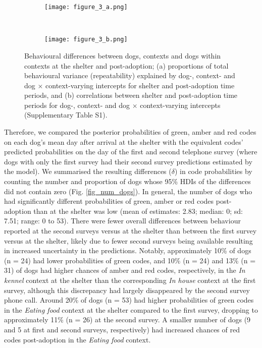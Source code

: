 \documentclass[fleqn,10pt]{wlscirep}
\begin{document}
\begin{figure}[t!]
  \centering
  \begin{subfigure}{0.5\textwidth}
    \centering
    \texttt{[image: figure\_3\_a.png]}
  \end{subfigure}%
  ~
  \begin{subfigure}{0.5\textwidth}
    \centering
    \texttt{[image: figure\_3\_b.png]}
  \end{subfigure}
  \caption{Behavioural differences between dogs, contexts and dogs within contexts at the shelter and post-adoption; (a) proportions of total behavioural variance (repeatability) explained by dog-, context- and dog $\times$ context-varying intercepts for shelter and post-adoption time periods, and (b) correlations between shelter and post-adoption time periods for dog-, context- and dog $\times$ context-varying intercepts (Supplementary Table S1).}
  \label{fig_corrs_rept}
\end{figure}

Therefore, we compared the posterior probabilities of green, amber and red codes on each dog's mean day after arrival at the shelter with the equivalent codes' predicted probabilities on the day of the first and second telephone survey (where dogs with only the first survey had their second survey predictions estimated by the model). We summarised the resulting differences ($\delta$) in code probabilities by counting the number and proportion of dogs whose 95\% HDIs of the differences did not contain zero (Fig. \ref{fig_num_dogs}). In general, the number of dogs who had significantly different probabilities of green, amber or red codes post-adoption than at the shelter was low (mean of estimates: 2.83; median: 0; sd: 7.51; range: 0 to 53). There were fewer overall differences between behaviour reported at the second surveys versus at the shelter than between the first survey versus at the shelter, likely due to fewer second surveys being available resulting in increased uncertainty in the predictions. Notably, approximately 10\% of dogs (n = 24) had lower probabilities of green codes, and 10\% (n = 24) and 13\% (n = 31) of dogs had higher chances of amber and red codes, respectively, in the \textit{In kennel} context at the shelter than the corresponding \textit{In house} context at the first survey, although this discrepancy had largely disappeared by the second survey phone call. Around 20\% of dogs (n = 53) had higher probabilities of green codes in the \textit{Eating food} context at the shelter compared to the first survey, dropping to approximately 11\% (n = 26) at the second survey. A smaller number of dogs (9 and 5 at first and second surveys, respectively) had increased chances of red codes post-adoption in the \textit{Eating food} context.
\end{document}
